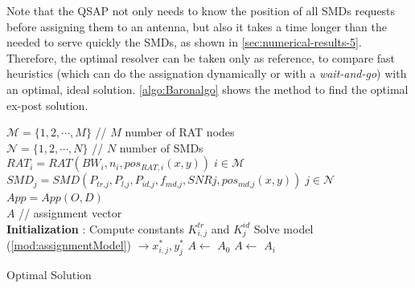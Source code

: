 \documentclass[twoside,openright]{report}
\newenvironment{boxedalgorithmic}
{\begin{lrbox}{\ieeealgbox}
\begin{minipage}{\dimexpr\columnwidth-2\fboxsep-2\fboxrule}
\begin{algorithmic}}
{\end{algorithmic}
\end{minipage}
\end{lrbox}\noindent\fbox{\usebox{\ieeealgbox}}}
\begin{document}
Note that the \gls{QSAP} not only needs to know the position of all \glspl{SMD} requests before assigning them to an antenna, but also it takes a time longer than the needed to serve quickly the \glspl{SMD}, as shown in \autoref{sec:numerical-results-5}. 
Therefore, the optimal resolver can be taken only as reference, to compare fast heuristics (which can do the assignation dynamically or with a \emph{wait-and-go}) with an optimal, ideal solution.
\autoref{algo:Baronalgo} shows the method to find the optimal ex-post solution.
\begin{algorithm}[htbp]
 \begin{boxedalgorithmic}
 \renewcommand{\algorithmiccomment}[1]{// #1}
 \renewcommand{\algorithmicrequire}{\textbf{Inputs:}}
 \renewcommand{\algorithmicensure}{\textbf{Output:}}
 \REQUIRE $\,$\\
 $\mathcal{M} = \{{1,2,\cdots, M\}}$ // $M$ number of RAT nodes \\
 $\mathcal{N} = \{{1,2,\cdots, N\}}$ // $N$ number of SMDs \\
 $\textit{RAT}_i = \textit{RAT}(\textit{BW}_i, n_i, pos_{RAT,i}(x,y))\;i \in \mathcal{M} $\\
 $\textit{SMD}_j = \textit{SMD}(P_\textit{tr,j},P_\textit{l,j},P_\textit{id,j},f_\textit{md,j},\textit{SNRj}, pos_\textit{md,j}(x,y))\;j \in \mathcal{N} $\\
 \STATE $\textit{App}=\textit{App}(O,D)$
 \ENSURE $\,$\\
 $A$ // assignment vector\\
 \textbf{Initialization} :
 \STATE Compute constants $K^\textit{tr}_{i,j}$ and $K^{id}_j$
 \STATE Solve model (\ref{mod:assignmentModel}) $\rightarrow x_{i,j}^*, y_j^*$
 \STATE $A \leftarrow$  $A_0$
 \ELSE
   \STATE $A \leftarrow$  $A_i$
   \ENDIF
   \ENDFOR
   \ENDIF
 \ENDFOR
 \end{boxedalgorithmic}
 \caption{Optimal Solution}
 \label{algo:Baronalgo}
 \end{algorithm}
\end{document}
